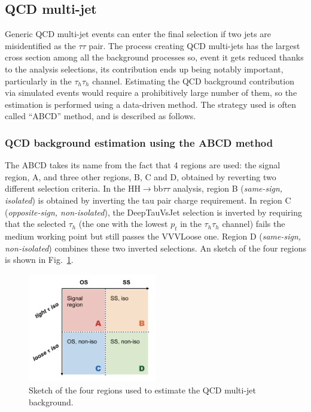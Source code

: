 \documentclass[../main.tex]{subfiles}
\begin{document}
\subsection{QCD multi-jet}
\label{hh:subs:qcd}


Generic QCD multi-jet events can enter the final selection if two jets are misidentified as the $\tau\tau$ pair. The process creating QCD multi-jets has the largest cross section among all the background processes so, event it gets reduced thanks to the analysis selections, its contribution ends up being notably important, particularly in the $\tau_h\tau_h$ channel. Estimating the QCD background contribution via simulated events would require a prohibitively large number of them, so the estimation is performed using a data-driven method. The strategy used is often called ``ABCD'' method, and is described as follows.


\subsubsection{QCD background estimation using the ABCD method}

The ABCD takes its name from the fact that 4 regions are used: the signal region, A, and three other regions, B, C and D, obtained by reverting two different selection criteria. In the HH$\to$bb$\tau\tau$ analysis, region B (\textit{same-sign, isolated}) is obtained by inverting the tau pair charge requirement. In region C (\textit{opposite-sign, non-isolated}), the DeepTauVsJet selection is inverted by requiring that the selected $\tau_h$ (the one with the lowest $p_t$ in the $\tau_h\tau_h$ channel) fails the medium working point but still passes the VVVLoose one. Region D (\textit{same-sign, non-isolated}) combines these two inverted selections. An sketch of the four regions is shown in Fig.~\ref{hh:fig:qcd_sketch}.

\begin{figure}[h!]
\begin{center}
\includegraphics[width=0.5\textwidth]{Images/QCDschema}
\end{center}
\caption{Sketch of the four regions used to estimate the QCD multi-jet background.}
\label{hh:fig:qcd_sketch}
\end{figure}
\end{document}
